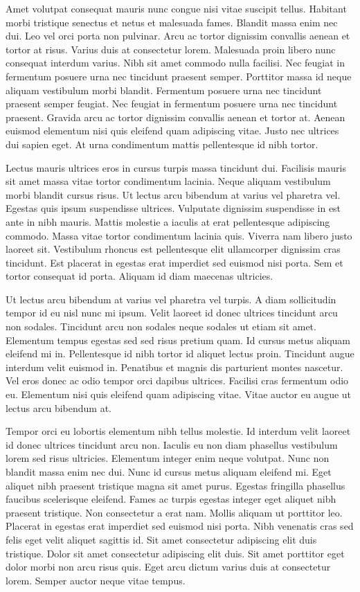 Amet volutpat consequat mauris nunc congue nisi vitae suscipit 
tellus. Habitant morbi tristique senectus et netus et malesuada fames. 
Blandit massa enim nec dui. Leo vel orci porta non pulvinar. Arcu ac 
tortor dignissim convallis aenean et tortor at risus. Varius duis at 
consectetur lorem. Malesuada proin libero nunc consequat interdum 
varius. Nibh sit amet commodo nulla facilisi. Nec feugiat in fermentum 
posuere urna nec tincidunt praesent semper. Porttitor massa id neque 
aliquam vestibulum morbi blandit. Fermentum posuere urna nec tincidunt 
praesent semper feugiat. Nec feugiat in fermentum posuere urna nec 
tincidunt praesent. Gravida arcu ac tortor dignissim convallis aenean et
 tortor at. Aenean euismod elementum nisi quis eleifend quam adipiscing 
vitae. Justo nec ultrices dui sapien eget. At urna condimentum mattis 
pellentesque id nibh tortor.


Lectus mauris ultrices eros in cursus turpis massa tincidunt dui. 
Facilisis mauris sit amet massa vitae tortor condimentum lacinia. Neque 
aliquam vestibulum morbi blandit cursus risus. Ut lectus arcu bibendum 
at varius vel pharetra vel. Egestas quis ipsum suspendisse ultrices. 
Vulputate dignissim suspendisse in est ante in nibh mauris. Mattis 
molestie a iaculis at erat pellentesque adipiscing commodo. Massa vitae 
tortor condimentum lacinia quis. Viverra nam libero justo laoreet sit. 
Vestibulum rhoncus est pellentesque elit ullamcorper dignissim cras 
tincidunt. Est placerat in egestas erat imperdiet sed euismod nisi 
porta. Sem et tortor consequat id porta. Aliquam id diam maecenas 
ultricies.


Ut lectus arcu bibendum at varius vel pharetra vel turpis. A diam 
sollicitudin tempor id eu nisl nunc mi ipsum. Velit laoreet id donec 
ultrices tincidunt arcu non sodales. Tincidunt arcu non sodales neque 
sodales ut etiam sit amet. Elementum tempus egestas sed sed risus 
pretium quam. Id cursus metus aliquam eleifend mi in. Pellentesque id 
nibh tortor id aliquet lectus proin. Tincidunt augue interdum velit 
euismod in. Penatibus et magnis dis parturient montes nascetur. Vel eros
 donec ac odio tempor orci dapibus ultrices. Facilisi cras fermentum 
odio eu. Elementum nisi quis eleifend quam adipiscing vitae. Vitae 
auctor eu augue ut lectus arcu bibendum at.


Tempor orci eu lobortis elementum nibh tellus molestie. Id interdum 
velit laoreet id donec ultrices tincidunt arcu non. Iaculis eu non diam 
phasellus vestibulum lorem sed risus ultricies. Elementum integer enim 
neque volutpat. Nunc non blandit massa enim nec dui. Nunc id cursus 
metus aliquam eleifend mi. Eget aliquet nibh praesent tristique magna 
sit amet purus. Egestas fringilla phasellus faucibus scelerisque 
eleifend. Fames ac turpis egestas integer eget aliquet nibh praesent 
tristique. Non consectetur a erat nam. Mollis aliquam ut porttitor leo. 
Placerat in egestas erat imperdiet sed euismod nisi porta. Nibh 
venenatis cras sed felis eget velit aliquet sagittis id. Sit amet 
consectetur adipiscing elit duis tristique. Dolor sit amet consectetur 
adipiscing elit duis. Sit amet porttitor eget dolor morbi non arcu risus
 quis. Eget arcu dictum varius duis at consectetur lorem. Semper auctor 
neque vitae tempus.


